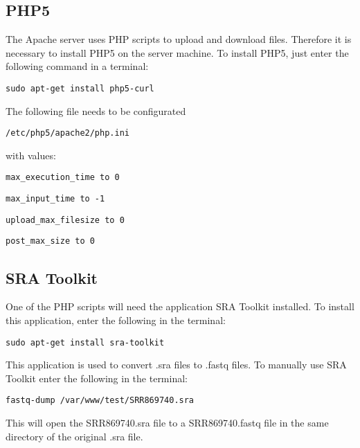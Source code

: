 \subsection{PHP5}
The Apache server uses PHP scripts to upload and download files. Therefore it is necessary to install PHP5 on the server machine. To install PHP5, just enter the following command in a terminal:
\begin{verbatim}sudo apt-get install php5-curl\end{verbatim}

The following file needs to be configurated \begin{verbatim}/etc/php5/apache2/php.ini\end{verbatim} with values:

\begin{verbatim}max_execution_time to 0\end{verbatim}
\begin{verbatim}max_input_time to -1\end{verbatim}
\begin{verbatim}upload_max_filesize to 0\end{verbatim}
\begin{verbatim}post_max_size to 0\end{verbatim}

\subsection{SRA Toolkit}
One of the PHP scripts will need the application SRA Toolkit installed. To install this application, enter the following in the terminal:
\begin{verbatim}sudo apt-get install sra-toolkit\end{verbatim}
This application is used to convert .sra files to .fastq files. To manually use SRA Toolkit enter the following in the terminal:
\begin{verbatim}fastq-dump /var/www/test/SRR869740.sra\end{verbatim}
This will open the SRR869740.sra file to a SRR869740.fastq file in the same directory of the original .sra file.





















